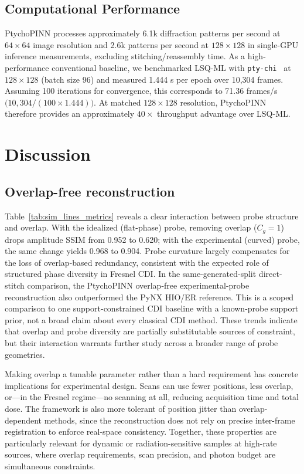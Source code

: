 \documentclass{optica-article}
\begin{document}
\subsection{Computational Performance}

PtychoPINN processes approximately 6.1k diffraction patterns per second at $64\times64$ image resolution and 2.6k patterns per second at $128\times128$ in single-GPU inference measurements, excluding stitching/reassembly time. As a high-performance conventional baseline, we benchmarked LSQ-ML with \texttt{pty-chi}~\cite{Du2025PtyChi} at $128\times128$ (batch size 96) and measured 1.444 s per epoch over 10,304 frames. Assuming 100 iterations for convergence, this corresponds to 71.36 frames/s \(\big(10{,}304/(100\times1.444)\big)\). At matched $128\times128$ resolution, PtychoPINN therefore provides an approximately $40\times$ throughput advantage over LSQ-ML.

\section{Discussion}

\subsection*{Overlap-free reconstruction}
Table~\ref{tab:sim_lines_metrics} reveals a clear interaction between probe structure and overlap. With the idealized (flat-phase) probe, removing overlap ($C_g=1$) drops amplitude SSIM from 0.952 to 0.620; with the experimental (curved) probe, the same change yields 0.968 to 0.904. Probe curvature largely compensates for the loss of overlap-based redundancy, consistent with the expected role of structured phase diversity in Fresnel CDI. In the same-generated-split direct-stitch comparison, the PtychoPINN overlap-free experimental-probe reconstruction also outperformed the PyNX HIO/ER reference. This is a scoped comparison to one support-constrained CDI baseline with a known-probe support prior, not a broad claim about every classical CDI method. These trends indicate that overlap and probe diversity are partially substitutable sources of constraint, but their interaction warrants further study across a broader range of probe geometries.

Making overlap a tunable parameter rather than a hard requirement has concrete implications for experimental design. Scans can use fewer positions, less overlap, or---in the Fresnel regime---no scanning at all, reducing acquisition time and total dose. The framework is also more tolerant of position jitter than overlap-dependent methods, since the reconstruction does not rely on precise inter-frame registration to enforce real-space consistency. Together, these properties are particularly relevant for dynamic or radiation-sensitive samples at high-rate sources, where overlap requirements, scan precision, and photon budget are simultaneous constraints.
\end{document}
